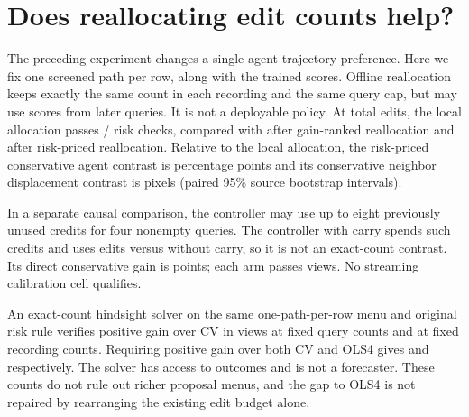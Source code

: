 \section{Does reallocating edit counts help?}
The preceding experiment changes a single-agent trajectory preference.
Here we fix one screened path per row, along with the trained scores.
Offline reallocation keeps exactly the same count in each recording
and the same query cap, but may use scores from later queries. It is
not a deployable policy. At \AllocationEdits{} total edits, the local
allocation passes \AllocationLocal{}/\AllocationViews{} risk checks,
compared with \AllocationGain{} after gain-ranked reallocation and
\AllocationRisk{} after risk-priced reallocation. Relative to the local
allocation, the risk-priced conservative agent contrast is
\AllocationRiskEffect{} percentage points and its conservative neighbor
displacement contrast is \AllocationPairEffect{} pixels (paired 95\%
source bootstrap intervals).

In a separate causal comparison, the controller may use up to eight
previously unused credits for four nonempty queries. The controller with
carry spends \AllocationPastCredits{} such credits and uses
\AllocationOnlineCarryEdits{} edits versus \AllocationOnlineLocalEdits{}
without carry, so it is not an exact-count contrast. Its direct
conservative gain is \AllocationCarryEffect{} points; each arm passes
\AllocationOnlineCarry{} views. No streaming calibration cell qualifies.

An exact-count hindsight solver on the same one-path-per-row menu and
original risk rule verifies positive gain over CV in
\AllocationCVQuery{} views at fixed query counts and
\AllocationCVRecord{} at fixed recording counts. Requiring positive
gain over both CV and OLS4 gives \AllocationDualQuery{} and
\AllocationDualRecord{} respectively. The solver has access to outcomes
and is not a forecaster. These counts do not rule out richer proposal
menus, and the gap to OLS4 is not repaired by rearranging the existing
edit budget alone.
